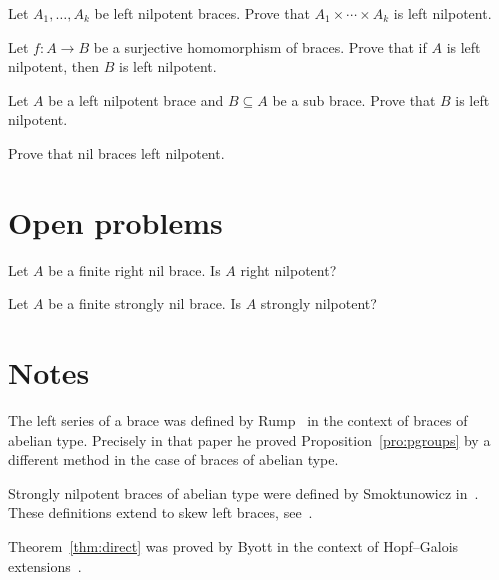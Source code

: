 \begin{prob}
    \label{prob:LN_direct}
    Let $A_1,\dots,A_k$ be left nilpotent braces. Prove that 
    $A_1\times\cdots\times A_k$ is left nilpotent.
\end{prob}

\begin{prob}
    \label{prob:LN_surj}
     Let $f\colon A\to B$ be a surjective homomorphism of braces. Prove that 
     if $A$ is left nilpotent, then $B$ is left nilpotent.
\end{prob}

\begin{prob}
    \label{prob:LN_sub}
    Let $A$ be a left nilpotent brace and $B\subseteq A$ be a sub brace. 
    Prove that $B$ is left nilpotent.
\end{prob}

\begin{prob}
    \label{prob:nil=>leftnilpotent}
    Prove that nil braces  left nilpotent. 
\end{prob}

\section*{Open problems}

\begin{problem}
    \label{question:rightnil=>rightnilp}
    Let $A$ be a finite right nil brace.  Is $A$ right
    nilpotent?
\end{problem}

\begin{problem}
    \label{question:stronglynil=>stronglynilp}
    Let $A$ be a finite strongly nil brace.
    Is $A$ strongly nilpotent?
\end{problem}

\section*{Notes}

The left series of a brace was defined by Rump~\cite{MR2278047} in the context of 
braces of abelian type. Precisely in that paper he proved 
Proposition~\ref{pro:pgroups} by a different method 
in the case of braces of abelian type. 

Strongly nilpotent braces of abelian type were defined by Smoktunowicz in~\cite{MR3814340}.
These definitions extend to skew left braces, see~\cite{MR3957824}.  

Theorem~\ref{thm:direct} was proved by Byott in the context of Hopf--Galois extensions~\cite{MR3030514}. 


